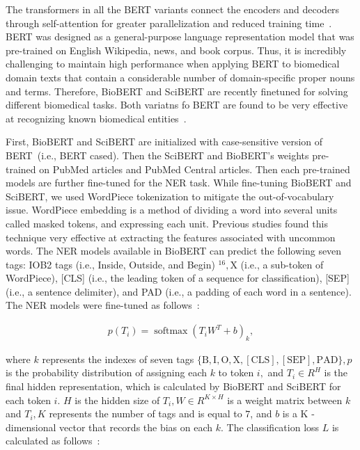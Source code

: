 \hspace*{3.5mm} The transformers in all the BERT variants connect the encoders and decoders through self-attention for greater parallelization and reduced training time~\cite{hasan2020knowledge,kim2019neural}. BERT was designed as a general-purpose language representation model that was pre-trained on English Wikipedia, news, and book corpus. Thus, it is incredibly challenging to maintain high performance when applying BERT to biomedical domain texts that contain a considerable number of domain-specific proper nouns and terms. 
Therefore, BioBERT and SciBERT are recently finetuned for solving different biomedical tasks. Both variatns fo BERT are found to be very effective at recognizing known biomedical entities~\cite{kim2019neural}. 

\hspace*{3.5mm} First, BioBERT and SciBERT are initialized with case-sensitive version of BERT~(i.e., BERT cased). Then the SciBERT and BioBERT's weights pre-trained on PubMed articles and PubMed Central articles. Then each pre-trained models are further fine-tuned for the NER task. While fine-tuning BioBERT and SciBERT, we used WordPiece tokenization to mitigate the out-of-vocabulary issue. WordPiece embedding is a method of dividing a word into several units called masked tokens, and expressing each unit. Previous studies found this technique very effective at extracting the features associated with uncommon words. The NER models available in BioBERT can predict the following seven tags: IOB2 tags (i.e., Inside, Outside, and Begin) $^{16}, \mathrm{X}$ (i.e., a sub-token of WordPiece), [CLS] (i.e., the leading token of a sequence for classification), [SEP] (i.e., a sentence delimiter), and PAD (i.e., a padding of each word in a sentence). The NER models were fine-tuned as follows~\cite{kim2019neural}:

\begin{align}
    p\left(T_{i}\right)=\operatorname{softmax}\left(T_{i} W^{T}+b\right)_{k},
\end{align}

\hspace*{3.5mm} where $k$ represents the indexes of seven tags $\{\mathrm{B}, \mathrm{I}, \mathrm{O}, \mathrm{X},[\mathrm{CLS}],[\mathrm{SEP}], \mathrm{PAD}\}, p$ is the probability distribution of assigning each $k$ to token $i,$ and $T_{i} \in R^{H}$ is the final hidden representation, which is calculated by BioBERT and SciBERT for each token $i$. $H$ is the hidden size of $T_{i}, W \in R^{K \times H}$ is a weight matrix between $k$ and $T_{i}, K$ represents the number of tags and is equal to $7$, and $b$ is a $\mathrm{K}$ -dimensional vector that records the bias on each $k$. The classification loss $L$ is calculated as follows~\cite{kim2019neural}:

